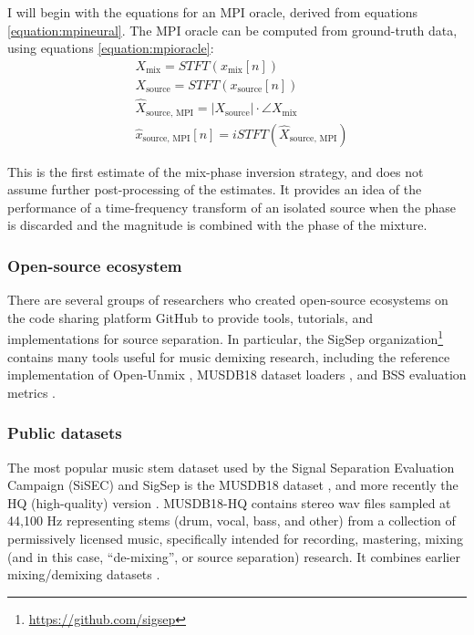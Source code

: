 \documentclass[report.tex]{subfiles}
\begin{document}
I will begin with the equations for an MPI oracle, derived from equations \eqref{equation:mpineural}. The MPI oracle can be computed from ground-truth data, using equations \eqref{equation:mpioracle}:
\begin{align}\tag{30}\label{equation:mpioracle}
	\nonumber & X_{\text{mix}} = \mathit{STFT}(x_{\text{mix}}[n])\\
	\nonumber & X_{\text{source}} = \mathit{STFT}(x_{\text{source}}[n])\\
	\nonumber & \hat{X}_{\text{source, MPI}} = |X_{\text{source}}| \cdot \angle{X_{\text{mix}}}\\
	\nonumber & \hat{x}_{\text{source, MPI}}[n] = \mathit{iSTFT}(\hat{X}_{\text{source, MPI}})
\end{align}

This is the first estimate of the mix-phase inversion strategy, and does not assume further post-processing of the estimates. It provides an idea of the performance of a time-frequency transform of an isolated source when the phase is discarded and the magnitude is combined with the phase of the mixture.

\subsubsection{Open-source ecosystem}

There are several groups of researchers who created open-source ecosystems on the code sharing platform GitHub to provide tools, tutorials, and implementations for source separation. In particular, the SigSep organization\footnote{\url{https://github.com/sigsep}} contains many tools useful for music demixing research, including the reference implementation of Open-Unmix \parencite{umx}, MUSDB18 dataset loaders \parencite{musdb18, musdb18hq}, and BSS evaluation metrics \parencite{bss, bss2, sisec2018}.

\subsubsection{Public datasets}

The most popular music stem dataset used by the Signal Separation Evaluation Campaign (SiSEC) and SigSep is the MUSDB18 dataset \parencite{musdb18}, and more recently the HQ (high-quality) version \parencite{musdb18hq}. MUSDB18-HQ contains stereo wav files sampled at 44,100 Hz representing stems (drum, vocal, bass, and other) from a collection of permissively licensed music, specifically intended for recording, mastering, mixing (and in this case, ``de-mixing'', or source separation) research. It combines earlier mixing/demixing datasets \parencite{sisec2016, otherdataset2}.
\end{document}
